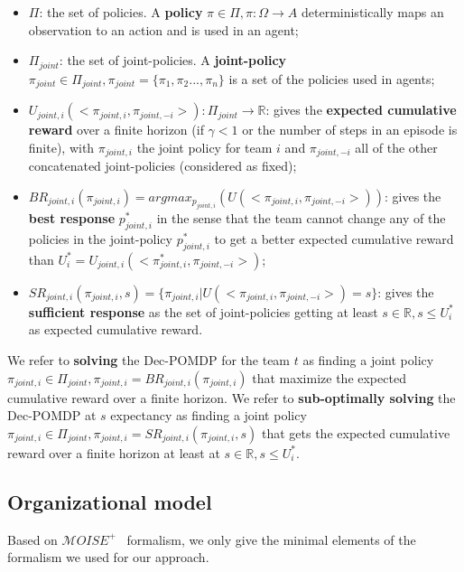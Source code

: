 \documentclass[runningheads]{llncs}
\begin{document}
\begin{itemize}
    \item $\Pi$: the set of policies. A \textbf{policy} $\pi \in \Pi, \pi: \Omega \rightarrow A$ deterministically maps an observation to an action and is used in an agent;
    \item $\Pi_{joint}$: the set of joint-policies. A \textbf{joint-policy} $\pi_{joint} \in \Pi_{joint}, \pi_{joint} = \{\pi_1, \pi_2...,\pi_n\}$ is a set of the policies used in agents;
    \item $U_{joint,i}(<\pi_{joint,i}, \pi_{joint,-i}>): \Pi_{joint} \rightarrow \mathbb{R}$: gives the \textbf{expected cumulative reward} over a finite horizon (if $\gamma < 1$ or the number of steps in an episode is finite), with $\pi_{joint,i}$ the joint policy for team $i$ and $\pi_{joint,-i}$ all of the other concatenated joint-policies (considered as fixed);
    \item $BR_{joint,i}(\pi_{joint,i}) = argmax_{p_{joint,i}}(U(<\pi_{joint,i},\pi_{joint,-i}>))$: gives the \textbf{best response} $p_{joint,i}^*$ in the sense that the team cannot change any of the policies in the joint-policy $p_{joint,i}^*$ to get a better expected cumulative reward than $U_i^* = U_{joint,i}(<\pi_{joint,i}^*, \pi_{joint,-i}>)$;
    \item $SR_{joint,i}(\pi_{joint,i}, s) = \{\pi_{joint,i} | U(<\pi_{joint,i},\pi_{joint,-i}>) = s\}$: gives the \textbf{sufficient response} as the set of joint-policies getting at least $s \in \mathbb{R}, s \leq U_i^*$ as expected cumulative reward.
\end{itemize}

We refer to \textbf{solving} the Dec-POMDP for the team $t$ as finding a joint policy $\pi_{joint,i} \in \Pi_{joint}, \pi_{joint,i} = BR_{joint,i}(\pi_{joint,i})$ that maximize the expected cumulative reward over a finite horizon.
We refer to \textbf{sub-optimally solving} the Dec-POMDP at $s$ expectancy as finding a joint policy $\pi_{joint,i} \in \Pi_{joint}, \pi_{joint,i} = SR_{joint,i}(\pi_{joint,i}, s)$ that gets the expected cumulative reward over a finite horizon at least at $s \in \mathbb{R}, s \leq U_i^*$.

\subsection{Organizational model}

Based on $\mathcal{M}OISE^+$~\cite{Hubner2007} formalism, we only give the minimal elements of the formalism we used for our approach.
\end{document}
